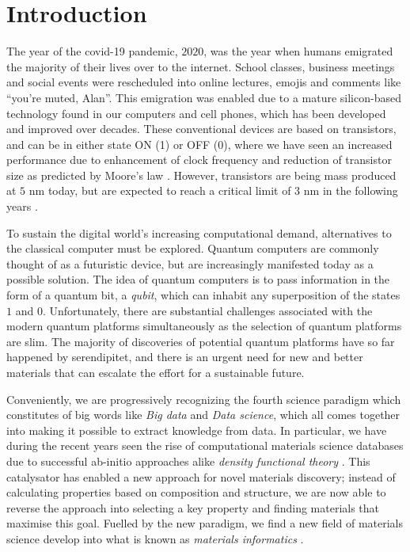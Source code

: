 \chapter{Introduction}

The year of the covid-19 pandemic, $2020$, was the year when humans emigrated the majority of their lives over to the internet. School classes, business meetings and social events were rescheduled into online lectures, emojis and comments like ``you're muted, Alan''. This emigration was enabled due to a mature silicon-based technology found in our computers and cell phones, which has been developed and improved over decades. These conventional devices are based on transistors, and can be in either state ON (1) or OFF (0), where we have seen an increased performance due to enhancement of clock frequency and reduction of transistor size as predicted by Moore's law \cite{Moore1965, Pavicic2006}. However, transistors are being mass produced at $5$ nm today, but are expected to reach a critical limit of $3$ nm in the following years \cite{Gwennap2020}.



To sustain the digital world's increasing computational demand, alternatives to the classical computer must be explored. Quantum computers are commonly thought of as a futuristic device, but are increasingly manifested today as a possible solution. The idea of quantum computers is to pass information in the form of a quantum bit, a \textit{qubit}, which can inhabit any superposition of the states $1$ and $0$. Unfortunately, there are substantial challenges associated with the modern quantum platforms simultaneously as the selection of quantum platforms are slim. The majority of discoveries of potential quantum platforms have so far happened by serendipitet, and there is an urgent need for new and better materials that can escalate the effort for a sustainable future.

Conveniently, we are progressively recognizing the fourth science paradigm which constitutes of big words like \textit{Big data} and \textit{Data science}, which all comes together into making it possible to extract knowledge from data. In particular, we have during the recent years seen the rise of computational materials science databases \cite{Curtarolo2012, Curtarolo2012a, Calderon2015, Jain2013, Saal2013, Kirklin2015, Choudhary2020, Allen1987} due to successful ab-initio approaches alike \textit{density functional theory} \cite{Kohn1965}. This catalysator has enabled a new approach for novel materials discovery; instead of calculating properties based on composition and structure, we are now able to reverse the approach into selecting a key property and finding materials that maximise this goal. Fuelled by the new paradigm, we find a new field of materials science develop into what is known as \textit{materials informatics} \cite{Rajan2005}.

